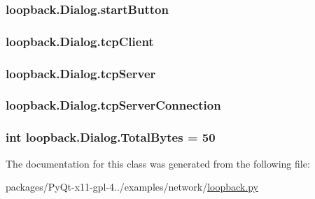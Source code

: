 \subsubsection[{start\+Button}]{\setlength{\rightskip}{0pt plus 5cm}loopback.\+Dialog.\+start\+Button}\label{classloopback_1_1Dialog_a078e8f38d3d954ee8c1f01f10be0a79e}
\hypertarget{classloopback_1_1Dialog_ae69896d6bfbd0588364a07b61dc6e714}{}
\subsubsection[{tcp\+Client}]{\setlength{\rightskip}{0pt plus 5cm}loopback.\+Dialog.\+tcp\+Client}\label{classloopback_1_1Dialog_ae69896d6bfbd0588364a07b61dc6e714}
\hypertarget{classloopback_1_1Dialog_a8ce655067cb8ace8a78bfe80031ac513}{}
\subsubsection[{tcp\+Server}]{\setlength{\rightskip}{0pt plus 5cm}loopback.\+Dialog.\+tcp\+Server}\label{classloopback_1_1Dialog_a8ce655067cb8ace8a78bfe80031ac513}
\hypertarget{classloopback_1_1Dialog_ab3a80320fb28eecfe21c55fa96d7b2d2}{}
\subsubsection[{tcp\+Server\+Connection}]{\setlength{\rightskip}{0pt plus 5cm}loopback.\+Dialog.\+tcp\+Server\+Connection}\label{classloopback_1_1Dialog_ab3a80320fb28eecfe21c55fa96d7b2d2}
\hypertarget{classloopback_1_1Dialog_a7fd97d763a95a30183d64716c072aeb8}{}
\subsubsection[{Total\+Bytes}]{\setlength{\rightskip}{0pt plus 5cm}int loopback.\+Dialog.\+Total\+Bytes = 50\hspace{0.3cm}{\ttfamily [static]}}\label{classloopback_1_1Dialog_a7fd97d763a95a30183d64716c072aeb8}


The documentation for this class was generated from the following file\+:\begin{DoxyCompactItemize}
\item 
packages/\+Py\+Qt-\/x11-\/gpl-\/4../examples/network/\hyperlink{loopback_8py}{loopback.\+py}\end{DoxyCompactItemize}
